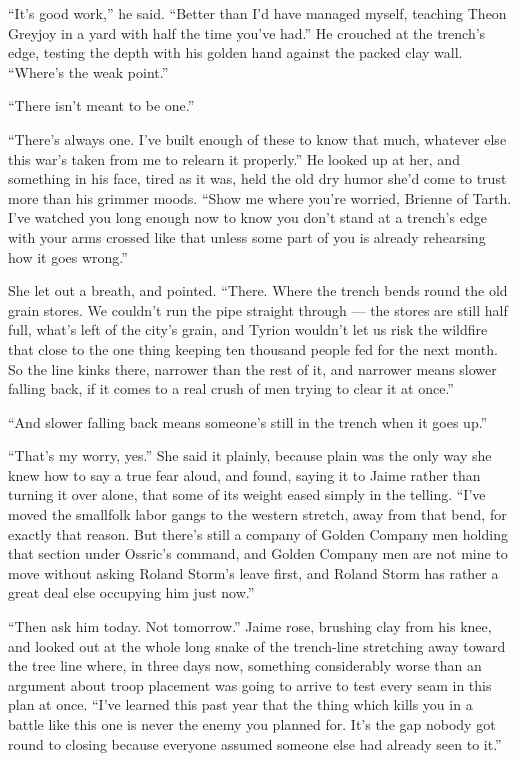 “It’s good work,” he said. “Better than I’d have managed myself, teaching Theon Greyjoy in a yard with half the time you’ve had.” He crouched at the trench’s edge, testing the depth with his golden hand against the packed clay wall. “Where’s the weak point.”

“There isn’t meant to be one.”

“There’s always one. I’ve built enough of these to know that much, whatever else this war’s taken from me to relearn it properly.” He looked up at her, and something in his face, tired as it was, held the old dry humor she’d come to trust more than his grimmer moods. “Show me where you’re worried, Brienne of Tarth. I’ve watched you long enough now to know you don’t stand at a trench’s edge with your arms crossed like that unless some part of you is already rehearsing how it goes wrong.”

She let out a breath, and pointed. “There. Where the trench bends round the old grain stores. We couldn’t run the pipe straight through — the stores are still half full, what’s left of the city’s grain, and Tyrion wouldn’t let us risk the wildfire that close to the one thing keeping ten thousand people fed for the next month. So the line kinks there, narrower than the rest of it, and narrower means slower falling back, if it comes to a real crush of men trying to clear it at once.”

“And slower falling back means someone’s still in the trench when it goes up.”

“That’s my worry, yes.” She said it plainly, because plain was the only way she knew how to say a true fear aloud, and found, saying it to Jaime rather than turning it over alone, that some of its weight eased simply in the telling. “I’ve moved the smallfolk labor gangs to the western stretch, away from that bend, for exactly that reason. But there’s still a company of Golden Company men holding that section under Ossric’s command, and Golden Company men are not mine to move without asking Roland Storm’s leave first, and Roland Storm has rather a great deal else occupying him just now.”

“Then ask him today. Not tomorrow.” Jaime rose, brushing clay from his knee, and looked out at the whole long snake of the trench-line stretching away toward the tree line where, in three days now, something considerably worse than an argument about troop placement was going to arrive to test every seam in this plan at once. “I’ve learned this past year that the thing which kills you in a battle like this one is never the enemy you planned for. It’s the gap nobody got round to closing because everyone assumed someone else had already seen to it.”

